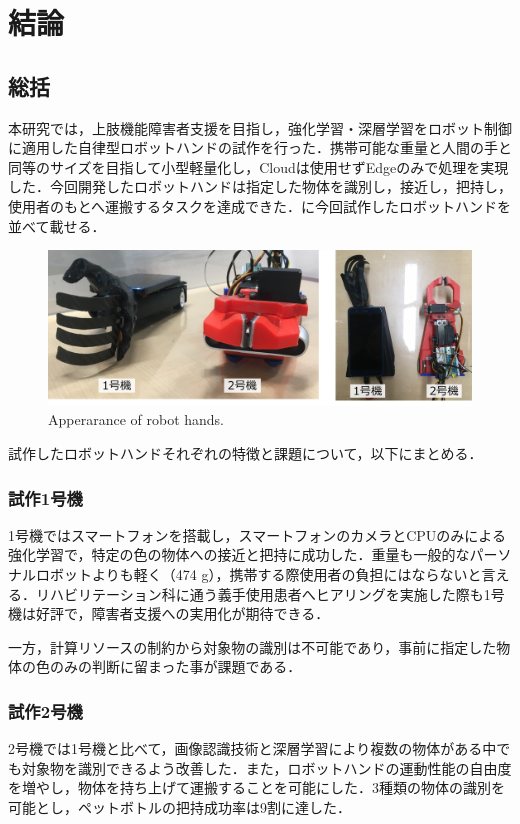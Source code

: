 \chapter{結論}
\newpage

\section{総括}
本研究では，上肢機能障害者支援を目指し，強化学習・深層学習をロボット制御に適用した自律型ロボットハンドの試作を行った．携帯可能な重量と人間の手と同等のサイズを目指して小型軽量化し，Cloudは使用せずEdgeのみで処理を実現した．今回開発したロボットハンドは指定した物体を識別し，接近し，把持し，使用者のもとへ運搬するタスクを達成できた．に今回試作したロボットハンドを並べて載せる．
\begin{figure}[H]
    \centering
    \includegraphics[width=\linewidth]{figure/chapter5/ロボットハンドまとめ}
    \caption{Apperarance of robot hands.}
    \label{fig:ロボットハンドまとめ}
\end{figure}
試作したロボットハンドそれぞれの特徴と課題について，以下にまとめる．

\subsection*{試作1号機}
1号機ではスマートフォンを搭載し，スマートフォンのカメラとCPUのみによる強化学習で，特定の色の物体への接近と把持に成功した．重量も一般的なパーソナルロボットよりも軽く（474 g），携帯する際使用者の負担にはならないと言える．リハビリテーション科に通う義手使用患者へヒアリングを実施した際も1号機は好評で，障害者支援への実用化が期待できる．

一方，計算リソースの制約から対象物の識別は不可能であり，事前に指定した物体の色のみの判断に留まった事が課題である．

\subsection*{試作2号機}
2号機では1号機と比べて，画像認識技術と深層学習により複数の物体がある中でも対象物を識別できるよう改善した．また，ロボットハンドの運動性能の自由度を増やし，物体を持ち上げて運搬することを可能にした．3種類の物体の識別を可能とし，ペットボトルの把持成功率は9割に達した．

